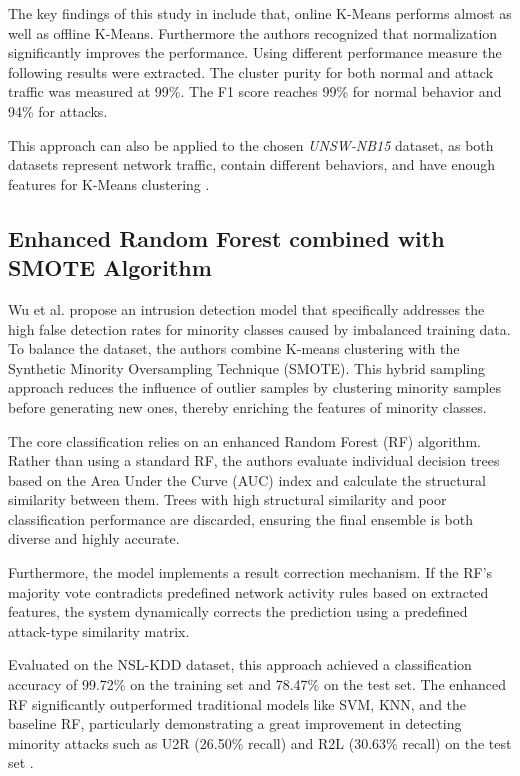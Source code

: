 \nextparagraph
The key findings of this study in include that, online K-Means performs almost as well as offline K-Means. Furthermore the authors recognized that normalization significantly improves the performance. Using different performance measure the following results were extracted. The cluster purity for both normal and attack traffic was measured at 99\%. The F1 score reaches 99\% for normal behavior and 94\% for attacks.

\nextparagraph
This approach can also be applied to the chosen \emph{UNSW-NB15} dataset, as both datasets represent network traffic, contain different behaviors, and have enough features for K-Means clustering \cite{younisse2023empirical}.

\subsection{Enhanced Random Forest combined with SMOTE Algorithm}
Wu et al. \cite{intrusion_detection_combined_random_forest} propose an intrusion detection model that specifically addresses the high false detection rates for minority classes caused by imbalanced training data. To balance the dataset, the authors combine K-means clustering with the Synthetic Minority Oversampling Technique (SMOTE). This hybrid sampling approach reduces the influence of outlier samples by clustering minority samples before generating new ones, thereby enriching the features of minority classes.

\nextparagraph
The core classification relies on an enhanced Random Forest (RF) algorithm. Rather than using a standard RF, the authors evaluate individual decision trees based on the Area Under the Curve (AUC) index and calculate the structural similarity between them. Trees with high structural similarity and poor classification performance are discarded, ensuring the final ensemble is both diverse and highly accurate. 


\nextparagraph
Furthermore, the model implements a result correction mechanism. If the RF's majority vote contradicts predefined network activity rules based on extracted features, the system dynamically corrects the prediction using a predefined attack-type similarity matrix.

\nextparagraph
Evaluated on the NSL-KDD dataset, this approach achieved a classification accuracy of 99.72\% on the training set and 78.47\% on the test set. The enhanced RF significantly outperformed traditional models like SVM, KNN, and the baseline RF, particularly demonstrating a great improvement in detecting minority attacks such as U2R (26.50\% recall) and R2L (30.63\% recall) on the test set
\cite{intrusion_detection_combined_random_forest}.